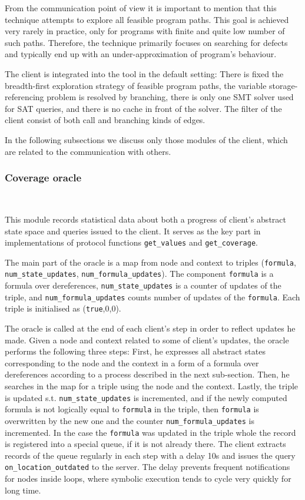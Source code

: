 \documentclass[envcountsame]{llncs}
\begin{document}
From the communication point of view it is important to mention that this
technique attempts to explore all feasible program paths. This goal is achieved
very rarely in practice, only for programs with finite and quite low number of
such paths. Therefore, the technique primarily focuses on searching for defects
and typically end up with an under-approximation of program's behaviour.

The client is integrated into the tool in the default setting: There is fixed the
breadth-first exploration strategy of feasible program paths, the variable
storage-referencing problem is resolved by branching, there is only one SMT
solver used for SAT queries, and there is no cache in front of the solver. The
filter of the client consist of both call and branching kinds of edges.

In the following subsections we discuss only those modules of the client, which
are related to the communication with others.

\subsubsection{Coverage oracle}~\\
\label{sec:CoverageSracleSE}

This module records statistical data about both a progress of client's abstract
state space and queries issued to the client. It serves as the key part in
implementations of protocol functions \texttt{get\_values} and
\texttt{get\_coverage}.

The main part of the oracle is a map from node and context to triples
(\texttt{formula}, \texttt{num\_state\_updates},
\texttt{num\_formula\_updates}). The component \texttt{formula} is a formula
over dereferences, \texttt{num\_state\_updates} is a counter of updates of the
triple, and \texttt{num\_formula\_updates} counts number of updates of the
\texttt{formula}. Each triple is initialised as (\texttt{true},0,0).

The oracle is called at the end of each client's step in order to reflect
updates he made. Given a node and context related to some of client's updates,
the oracle performs the following three steps: First, he expresses all abstract
states corresponding to the node and the context in a form of a formula over
dereferences according to a process described in the next sub-section. Then, he
searches in the map for a triple using the node and the context. Lastly, the
triple is updated s.t. \texttt{num\_state\_updates} is incremented, and if the
newly computed formula is not logically equal to \texttt{formula} in the triple,
then \texttt{formula} is overwritten by the new one and the counter
\texttt{num\_formula\_updates} is incremented. In the case the \texttt{formula}
was updated in the triple whole the record is registered into a special queue,
if it is not already there. The client extracts records of the queue regularly
in each step with a delay 10s and issues the query
\texttt{on\_location\_outdated} to the server. The delay prevents frequent
notifications for nodes inside loops, where symbolic execution tends to cycle
very quickly for long time.
\end{document}
